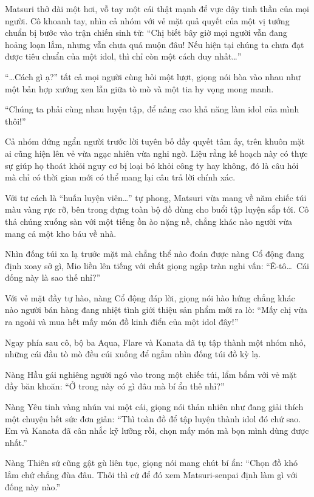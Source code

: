 \documentclass[../main.tex]{subfiles}
\begin{document}
Matsuri thở dài một hơi, vỗ tay một cái thật mạnh để vực dậy tinh thần của mọi người. Cô khoanh tay, nhìn cả nhóm với vẻ mặt quả quyết của một vị tướng chuẩn bị bước vào trận chiến sinh tử: ``Chị biết bây giờ mọi người vẫn đang hoảng loạn lắm, nhưng vẫn chưa quá muộn đâu! Nếu hiện tại chúng ta chưa đạt được tiêu chuẩn của một idol, thì chỉ còn một cách duy nhất\dots''

``\dots Cách gì ạ?'' tất cả mọi người cùng hỏi một lượt, giọng nói hòa vào nhau như một bản hợp xướng xen lẫn giữa tò mò và một tia hy vọng mong manh.

``Chúng ta phải cùng nhau luyện tập, để nâng cao khả năng làm idol của mình thôi!''

Cả nhóm đứng ngẩn người trước lời tuyên bố đầy quyết tâm ấy, trên khuôn mặt ai cũng hiện lên vẻ vừa ngạc nhiên vừa nghi ngờ. Liệu rằng kế hoạch này có thực sự giúp họ thoát khỏi nguy cơ bị loại bỏ khỏi công ty hay không, đó là câu hỏi mà chỉ có thời gian mới có thể mang lại câu trả lời chính xác.

\ct

Với tư cách là ``huấn luyện viên\dots'' tự phong, Matsuri vừa mang về năm chiếc túi màu vàng rực rỡ, bên trong đựng toàn bộ đồ dùng cho buổi tập luyện sắp tới. Cô thả chúng xuống sàn với một tiếng ồn ào nặng nề, chẳng khác nào người vừa mang cả một kho báu về nhà.

Nhìn đống túi xa lạ trước mặt mà chẳng thể nào đoán được nàng Cổ động đang định xoay sở gì, Mio liền lên tiếng với chất giọng ngập tràn nghi vấn: ``Ê-tô\dots\ Cái đống này là sao thế nhỉ?''


Với vẻ mặt đầy tự hào, nàng Cổ động đáp lời, giọng nói hào hứng chẳng khác nào người bán hàng đang nhiệt tình giới thiệu sản phẩm mới ra lò: ``Mấy chị vừa ra ngoài và mua hết mấy món đồ kinh điển của một idol đây!''

Ngay phía sau cô, bộ ba Aqua, Flare và Kanata đã tụ tập thành một nhóm nhỏ, những cái đầu tò mò đều cúi xuống để ngắm nhìn đống túi đồ kỳ lạ.

Nàng Hầu gái nghiêng người ngó vào trong một chiếc túi, lẩm bẩm với vẻ mặt đầy băn khoăn: ``Ở trong này có gì đâu mà bí ẩn thế nhỉ?''

Nàng Yêu tinh vàng nhún vai một cái, giọng nói thản nhiên như đang giải thích một chuyện hết sức đơn giản: ``Thì toàn đồ để tập luyện thành idol đó chứ sao. Em và Kanata đã cân nhắc kỹ lưỡng rồi, chọn mấy món mà bọn mình dùng được nhất.''

Nàng Thiên sứ cũng gật gù liên tục, giọng nói mang chút bí ẩn: ``Chọn đồ khó lắm chứ chẳng đùa đâu. Thôi thì cứ để đó xem Matsuri-senpai định làm gì với đống này nào.''
\end{document}
